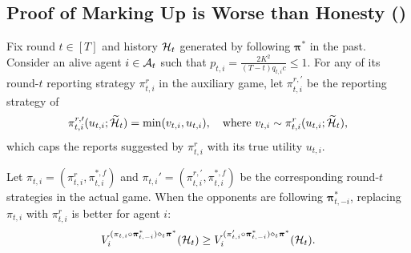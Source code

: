 \subsection{Proof of Marking Up is Worse than Honesty ()}
\begin{lemma}\label{lem:min report with u is good formal}
Fix round $t\in[T]$ and history $\mathcal{H}_t$ generated by following $\bm \pi^\ast$ in the past. Consider an alive agent $i\in\mathcal{A}_t$ such that $p_{t,i}=\frac{2K^2}{(T-t)q_{t,i} c} \leq 1$. For any of its round-$t$ reporting strategy $\pi^r_{t,i}$ in the auxiliary game, let $\pi_{t,i}^{r,\prime}$ be the reporting strategy of
\begin{equation*}
\pi_{t,i}^{r,\prime}(u_{t,i};\widetilde {\mathcal{H}}_t)=\min(v_{t,i},u_{t,i}),\quad \text{where }v_{t,i}\sim \pi^r_{t,i}(u_{t,i};\widetilde {\mathcal{H}}_t),
\end{equation*}
which caps the reports suggested by $\pi^r_{t,i}$ with its true utility $u_{t,i}$.

Let $\pi_{t,i}=(\pi^r_{t,i},{\pi}_{t,i}^{\ast,f})$ and $\pi_{t,i}'=(\pi_{t,i}^{r,\prime},{\pi}_{t,i}^{\ast,f})$ be the corresponding round-$t$ strategies in the actual game.
When the opponents are following $\bm \pi_{t,-i}^\ast$, replacing $\pi_{t,i}$ with $\pi^r_{t,i}$ is better for agent $i$:
\begin{equation*}
V_i^{(\pi_{t,i}\circ \bm\pi^\ast_{t,-i})\diamond_t \bm\pi^\ast}(\mathcal{H}_t) \geq V_i^{(\pi'_{t,i}\circ \bm\pi^\ast_{t,-i})\diamond_t \bm\pi^\ast}(\mathcal{H}_t).
\end{equation*}
\end{lemma}
